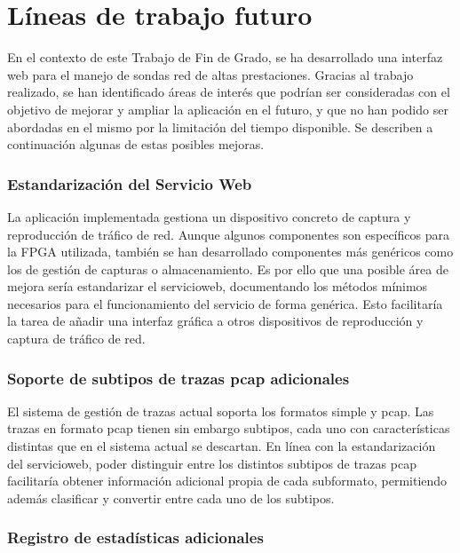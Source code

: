 \chapter{Líneas de trabajo futuro\label{cap:lineasDeTrabajoFuturo}}

En el contexto de este Trabajo de Fin de Grado, se ha desarrollado una interfaz web para el manejo de sondas red de altas prestaciones. Gracias al trabajo realizado, se han identificado áreas de interés que podrían ser consideradas con el objetivo de mejorar y ampliar la aplicación en el futuro, y que no han podido ser abordadas en el mismo por la limitación del tiempo disponible. Se describen a continuación algunas de estas posibles mejoras.

\subsection*{Estandarización del Servicio Web}

La aplicación implementada gestiona un dispositivo concreto de captura y reproducción de tráfico de red. Aunque algunos componentes son específicos para la \gls{FPGA} utilizada, también se han desarrollado componentes más genéricos como los de gestión de capturas o almacenamiento. Es por ello que una posible área de mejora sería estandarizar el \gls{servicioweb}, documentando los métodos mínimos necesarios para el funcionamiento del servicio de forma genérica. Esto facilitaría la tarea de añadir una interfaz gráfica a otros dispositivos de reproducción y captura de tráfico de red.


\subsection*{Soporte de subtipos de trazas pcap adicionales}

El sistema de gestión de \glspl{traza} actual soporta los formatos \gls{simple} y \gls{pcap}. Las \glspl{traza} en formato \gls{pcap} tienen sin embargo subtipos, cada uno con características distintas que en el sistema actual se descartan. En línea con la estandarización del \gls{servicioweb}, poder distinguir entre los distintos subtipos de \glspl{traza} \gls{pcap} facilitaría obtener información adicional propia de cada subformato, permitiendo además clasificar y convertir entre cada uno de los subtipos.


\subsection*{Registro de estadísticas adicionales}


